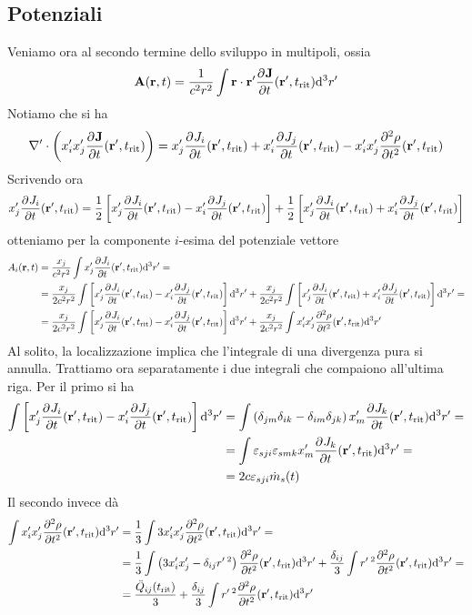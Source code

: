 \documentclass[a4paper,11pt]{article}
\renewcommand{\d}{\mathrm{d}}
\renewcommand{\vec}[1]{\mathbf{#1}}
\renewcommand{\t}{t_{\mathrm{rit}}}
\begin{document}
\subsection{Potenziali}
Veniamo ora al secondo termine dello sviluppo in multipoli, ossia
\[\vec{A}(\vec{r},t)=\frac{1}{c^2r^2}\int \vec{r}\cdot\vec{r}'\pder{\vec{J}}{t}(\vec{r}',\t)\d^3r'\]
Notiamo che si ha
\[\nabla'\cdot\left(x_i'x_j'\pder{\vec{J}}{t}(\vec{r}',\t)\right)=x_j'\pder{J_i}{t}(\vec{r}',\t)+x_i'\pder{J_j}{t}(\vec{r}',\t)-x_i'x_j'\pder[2]{\rho}{t}(\vec{r}',\t)\]
Scrivendo ora
\[x_j'\pder{J_i}{t}(\vec{r}',\t)=\frac{1}{2}\left[x_j'\pder{J_i}{t}(\vec{r}',\t)-x_i'\pder{J_j}{t}(\vec{r}',\t)\right]+\frac{1}{2}\left[x_j'\pder{J_i}{t}(\vec{r}',\t)+x_i'\pder{J_j}{t}(\vec{r}',\t)\right]\]
otteniamo per la componente $i$-esima del potenziale vettore
\begin{align*}
	A_{i}(\vec{r},t)&=\frac{x_j}{c^2r^2}\int x_j'\pder{J_i}{t}(\vec{r}',\t)\d^3r'=\\&=\frac{x_j}{2c^2r^2}\int\left[x_j'\pder{J_i}{t}(\vec{r}',\t)-x_i'\pder{J_j}{t}(\vec{r}',\t)\right]\d^3r'+\frac{x_j}{2c^2r^2}\int\left[x_j'\pder{J_i}{t}(\vec{r}',\t)+x_i'\pder{J_j}{t}(\vec{r}',\t)\right]\d^3r'=\\&=\frac{x_j}{2c^2r^2}\int\left[x_j'\pder{J_i}{t}(\vec{r}',\t)-x_i'\pder{J_j}{t}(\vec{r}',\t)\right]\d^3r'+\frac{x_j}{2c^2r^2}\int x_i'x_j'\pder[2]{\rho}{t}(\vec{r}',\t)\d^3r'
\end{align*}
Al solito, la localizzazione implica che l'integrale di una divergenza pura si annulla. Trattiamo ora separatamente i due integrali che compaiono all'ultima riga. Per il primo si ha
\begin{align*}
	\int\left[x_j'\pder{J_i}{t}(\vec{r}',\t)-x_i'\pder{J_j}{t}(\vec{r}',\t)\right]\d^3r'&=\int\left(\delta_{jm}\delta_{ik}-\delta_{im}\delta_{jk}\right)x_m'\pder{J_k}{t}(\vec{r}',\t)\d^3r'=\\&=\int \varepsilon_{sji}\varepsilon_{smk}x_m'\pder{J_k}{t}(\vec{r}',\t)\d^3r'=\\&=2c\varepsilon_{sji}\dot{m}_s(t)
\end{align*}
Il secondo invece dà
\begin{align*}
	\int x_i'x_j'\pder[2]{\rho}{t}(\vec{r}',\t)\d^3r'&=\frac{1}{3}\int 3 x_i'x_j'\pder[2]{\rho}{t}(\vec{r}',\t)\d^3r'=\\&=\frac{1}{3}\int \left(3 x_i'x_j'-\delta_{ij}r'\,^2\right)\pder[2]{\rho}{t}(\vec{r}',\t)\d^3r'+\frac{\delta_{ij
	}}{3}\int r'\,^2\pder[2]{\rho}{t}(\vec{r}',\t)\d^3r'=\\&=\frac{\ddot{Q}_{ij}(\t)}{3}+\frac{\delta_{ij
}}{3}\int r'\,^2\pder[2]{\rho}{t}(\vec{r}',\t)\d^3r'
\end{align*}
\end{document}
